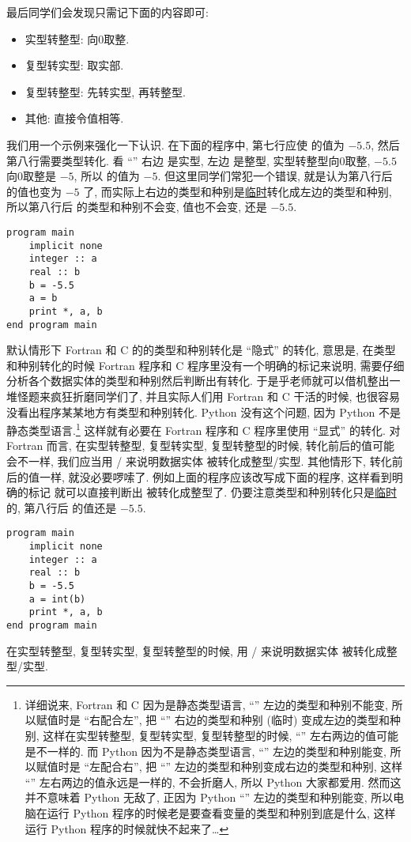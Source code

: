 最后同学们会发现只需记下面的内容即可:
\begin{itemize}
    \item 实型转整型: 向0取整.
    \item 复型转实型: 取实部.
    \item 复型转整型: 先转实型, 再转整型.
    \item 其他: 直接令值相等.
\end{itemize}

我们用一个示例来强化一下认识. 在下面的程序中, 第七行应使  的值为 $-5.5$, 然后第八行需要类型转化. 看 ``\ttt{=}'' 右边  是实型, 左边  是整型, 实型转整型向0取整, $-5.5$ 向0取整是 $-5$, 所以  的值为 $-5$. 但这里同学们常犯一个错误, 就是认为第八行后  的值也变为 $-5$ 了, 而实际上右边的类型和种别是\uline{临时}转化成左边的类型和种别, 所以第八行后  的类型和种别不会变, 值也不会变, 还是 $-5.5$.
\begin{lstlisting}
program main
    implicit none
    integer :: a
    real :: b
    b = -5.5
    a = b
    print *, a, b
end program main
\end{lstlisting}

默认情形下 Fortran 和 C 的的类型和种别转化是 ``隐式'' 的转化, 意思是, 在类型和种别转化的时候 Fortran 程序和 C 程序里没有一个明确的标记来说明, 需要仔细分析各个数据实体的类型和种别然后判断出有转化. 于是乎老师就可以借机整出一堆怪题来疯狂折磨同学们了, 并且实际人们用 Fortran 和 C 干活的时候, 也很容易没看出程序某某地方有类型和种别转化. Python 没有这个问题, 因为 Python 不是静态类型语言.\footnote{详细说来, Fortran 和 C 因为是静态类型语言, ``\ttt{=}'' 左边的类型和种别不能变, 所以赋值时是 ``右配合左'', 把 ``\ttt{=}'' 右边的类型和种别 (临时) 变成左边的类型和种别, 这样在实型转整型, 复型转实型, 复型转整型的时候, ``\ttt{=}'' 左右两边的值可能是不一样的. 而 Python 因为不是静态类型语言, ``\ttt{=}'' 左边的类型和种别能变, 所以赋值时是 ``左配合右'', 把 ``\ttt{=}'' 左边的类型和种别变成右边的类型和种别, 这样 ``\ttt{=}'' 左右两边的值永远是一样的, 不会折磨人, 所以 Python 大家都爱用. 然而这并不意味着 Python 无敌了, 正因为 Python ``\ttt{=}'' 左边的类型和种别能变, 所以电脑在运行 Python 程序的时候老是要查看变量的类型和种别到底是什么, 这样运行 Python 程序的时候就快不起来了\dots{}} 这样就有必要在 Fortran 程序和 C 程序里使用 ``显式'' 的转化. 对 Fortran 而言, 在实型转整型, 复型转实型, 复型转整型的时候, 转化前后的值可能会不一样, 我们应当用 / 来说明数据实体 \ttt{[entity]} 被转化成整型/实型. 其他情形下, 转化前后的值一样, 就没必要啰嗦了. 例如上面的程序应该改写成下面的程序, 这样看到明确的标记  就可以直接判断出  被转化成整型了. 仍要注意类型和种别转化只是\uline{临时}的, 第八行后  的值还是 $-5.5$.
\begin{lstlisting}
program main
    implicit none
    integer :: a
    real :: b
    b = -5.5
    a = int(b)
    print *, a, b
end program main
\end{lstlisting}
\begin{convention}
    在实型转整型, 复型转实型, 复型转整型的时候, 用  / 来说明数据实体 \ttt{\emph{[entity]}} 被转化成整型/实型.
\end{convention}

